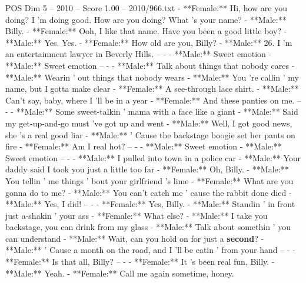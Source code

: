 \begin{textsample}{POS Dim 5 – 2010 – Score 1.00 – 2010/966.txt}  \label{ex:f5_pos_033}
- **Female:** Hi, how are you doing?
I 'm doing good.
How are you doing?
What 's your name? - **Male:** Billy. - **Female:** Ooh, I like that name.
Have you been a good little boy? - **Male:** Yes.
Yes. - **Female:** How old are you, Billy? - **Male:** 26.
I 'm an entertainment lawyer in Beverly Hills. -- - - **Male:** Sweet emotion - **Male:** Sweet emotion -- - - **Male:** Talk about things that nobody cares - **Male:** Wearin ' out things that nobody wears - **Male:** You 're callin ' my name, but I gotta make clear - **Female:** A see-through lace shirt. - **Male:** Can't say, baby, where I 'll be in a year - **Female:** And these panties on me. -- - - **Male:** Some sweet-talkin ' mama with a face like a giant - **Male:** Said my get-up-and-go must 've got up and went - **Male:** Well, I got good news, she 's a real good liar - **Male:** ' Cause the backstage boogie set her pants on fire - **Female:** Am I real hot? -- - - **Male:** Sweet emotion - **Male:** Sweet emotion -- - - **Male:** I pulled into town in a police car - **Male:** Your daddy said I took you just a little too far - **Female:** Oh, Billy. - **Male:** You tellin ' me things ' bout your girlfriend 's lime - **Female:** What are you gonna do to me? - **Male:** You can't catch me ' cause the rabbit done died - **Male:** Yes, I did! -- - - **Female:** Yes, Billy. - **Male:** Standin ' in front just a-shakin ' your ass - **Female:** What else? - **Male:** I take you backstage, you can drink from my glass - **Male:** Talk about somethin ' you can understand - **Male:** Wait, can you hold on for just a \textbf{second}? - **Male:** ' Cause a month on the road, and I 'll be eatin ' from your hand -- - - **Female:** Is that all, Billy? -- - - **Female:** It 's been real fun, Billy. - **Male:** Yeah. - **Female:** Call me again sometime, honey.

\end{textsample}
